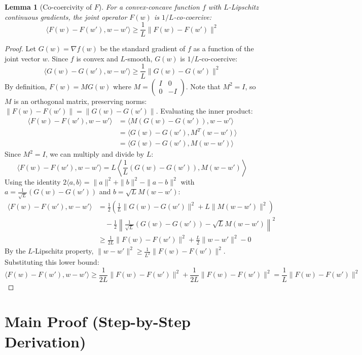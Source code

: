 \documentclass{article}
\newtheorem{lemma}[theorem]{Lemma}
\begin{document}
\begin{lemma}[Co-coercivity of $F$]
For a convex-concave function $f$ with $L$-Lipschitz continuous gradients, the joint operator $F(w)$ is $1/L$-co-coercive:
$$ \langle F(w) - F(w'), w - w' \rangle \geq \frac{1}{L} \|F(w) - F(w')\|^2 $$
\end{lemma}
\begin{proof}
Let $G(w) = \nabla f(w)$ be the standard gradient of $f$ as a function of the joint vector $w$. Since $f$ is convex and $L$-smooth, $G(w)$ is $1/L$-co-coercive:
$$ \langle G(w) - G(w'), w - w' \rangle \geq \frac{1}{L} \|G(w) - G(w')\|^2 $$
By definition, $F(w) = M G(w)$ where $M = \begin{pmatrix} I & 0 \\ 0 & -I \end{pmatrix}$. Note that $M^2 = I$, so $M$ is an orthogonal matrix, preserving norms: $\|F(w) - F(w')\| = \|G(w) - G(w')\|$. Evaluating the inner product:
\begin{align*}
\langle F(w) - F(w'), w - w' \rangle &= \langle M(G(w) - G(w')), w - w' \rangle \\
&= \langle G(w) - G(w'), M^T(w - w') \rangle \\
&= \langle G(w) - G(w'), M(w - w') \rangle
\end{align*}
Since $M^2 = I$, we can multiply and divide by $L$:
$$ \langle F(w) - F(w'), w - w' \rangle = L \left\langle \frac{1}{L} (G(w) - G(w')), M(w - w') \right\rangle $$
Using the identity $2 \langle a, b \rangle = \|a\|^2 + \|b\|^2 - \|a-b\|^2$ with $a = \frac{1}{\sqrt{L}}(G(w) - G(w'))$ and $b = \sqrt{L} M(w - w')$:
\begin{align*}
\langle F(w) - F(w'), w - w' \rangle &= \frac{1}{2} \left( \frac{1}{L} \|G(w) - G(w')\|^2 + L \|M(w - w')\|^2 \right) \\
&\quad - \frac{1}{2} \left\| \frac{1}{\sqrt{L}}(G(w) - G(w')) - \sqrt{L} M(w - w') \right\|^2 \\
&\geq \frac{1}{2L} \|F(w) - F(w')\|^2 + \frac{L}{2} \|w - w'\|^2 - 0
\end{align*}
By the $L$-Lipschitz property, $\|w - w'\|^2 \geq \frac{1}{L^2} \|F(w) - F(w')\|^2$. Substituting this lower bound:
$$ \langle F(w) - F(w'), w - w' \rangle \geq \frac{1}{2L} \|F(w) - F(w')\|^2 + \frac{1}{2L} \|F(w) - F(w')\|^2 = \frac{1}{L} \|F(w) - F(w')\|^2 $$
\end{proof}

\section*{Main Proof (Step-by-Step Derivation)}
\end{document}

